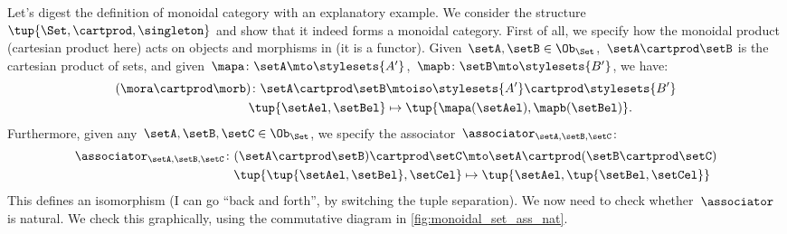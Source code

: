 
\begin{example}
	Let's digest the definition of monoidal category with an explanatory example.
	We consider the structure~$\tup{\Set,\cartprod,\singleton}$ and show that it indeed forms a monoidal category.
	First of all, we specify how the monoidal product (cartesian product here) acts on objects and morphisms in \Set (it is a functor).
	Given~$\setA,\setB\in \Ob_{\Set}$,~$\setA\cartprod \setB$ is the cartesian product of sets, and given~$\mapa\colon \setA\mto \stylesets{A'}$,~$\mapb\colon \setB\mto \stylesets{B'}$, we have:
	\begin{equation*}
		\label{eq:set_mon_prod_2}
		\begin{aligned}
			(\mora \cartprod \morb)
			\colon \setA\cartprod \setB & \mtoiso \stylesets{A'}\cartprod \stylesets{B'} \\
			\tup{\setAel,\setBel}       & \mapsto \tup{\mapa(\setAel),\mapb(\setBel)}.
		\end{aligned}
	\end{equation*}
	Furthermore, given any~$\setA,\setB,\setC\in \Ob_{\Set}$, we specify the associator~$\associator_{\setA,\setB,\setC}$:
	\begin{equation*}
		\label{eq:set_mon_prod_3}
		\begin{aligned}
			\associator_{\setA,\setB,\setC}\colon (\setA\cartprod \setB)\cartprod \setC & \mto \setA\cartprod (\setB\cartprod \setC)  \\
			\tup{\tup{\setAel,\setBel},\setCel}                                         & \mapsto \tup{\setAel,\tup{\setBel,\setCel}}
		\end{aligned}
	\end{equation*}
	This defines an isomorphism (I can go ``back and forth'', by switching the tuple separation).
	We now need to check whether~$\associator$ is natural.
	We check this graphically, using the commutative diagram in \cref{fig:monoidal_set_ass_nat}.


\end{example}

